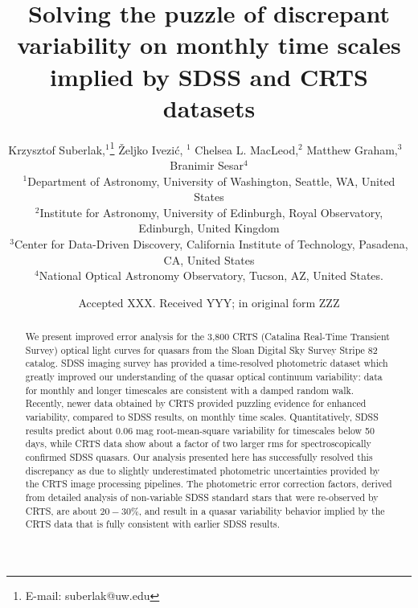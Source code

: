 \documentclass[fleqn,usenatbib]{mnras}  %
\title[Quasar Variability]{Solving the puzzle of discrepant variability on monthly time scales implied by SDSS and CRTS datasets}
\author[K. Suberlak et al.]{
Krzysztof Suberlak,$^{1}$\thanks{E-mail: suberlak@uw.edu}
\v{Z}eljko Ivezi\'c, $^{1}$
Chelsea L. MacLeod,$^{2}$
Matthew Graham,$^{3}$ 
\newauthor
$\, \,  $Branimir Sesar$^{4}$
\\
$^{1}$Department of Astronomy, University of Washington, Seattle, WA, United States\\
$^{2}$Institute for Astronomy, University of Edinburgh, Royal Observatory, Edinburgh, United Kingdom\\
$^{3}$Center for Data-Driven Discovery, California Institute of Technology, Pasadena, CA, United States\\
$^{4}$National Optical Astronomy Observatory, Tucson, AZ, United States.
}
\date{Accepted XXX. Received YYY; in original form ZZZ}
\begin{document}
\label{firstpage}
\pagerange{\pageref{firstpage}--\pageref{lastpage}}
\maketitle

\begin{abstract}

We present improved error analysis for the 3,800 CRTS (Catalina Real-Time Transient Survey) optical  light curves for quasars from the Sloan Digital Sky Survey Stripe 82 catalog. SDSS imaging survey has provided a time-resolved photometric  dataset which greatly improved our understanding of the quasar optical continuum variability: data for monthly and longer timescales  are consistent with a damped random walk. Recently, newer data  obtained by CRTS provided  puzzling evidence for enhanced variability, compared to SDSS results, on monthly time scales. Quantitatively, SDSS results predict  about $0.06$ mag root-mean-square variability for timescales below 50 days, while CRTS data show about a factor of two larger rms for spectroscopically confirmed SDSS quasars. Our analysis presented here has successfully resolved this discrepancy as due to slightly underestimated photometric uncertainties provided by the CRTS image processing pipelines. The photometric error correction factors, derived from detailed analysis of non-variable SDSS standard stars that were re-observed by CRTS, are about $20-30\%$, and result in a quasar variability behavior implied by the CRTS data that is fully consistent with earlier SDSS results.


\end{abstract}



\end{document}
